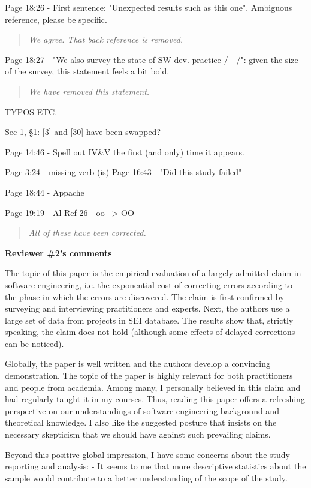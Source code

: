 \documentclass[smallcondensed]{svjour3}
\begin{document}
 
Page 18:26 - First sentence: "Unexpected results such as this one". Ambiguous reference,
please be specific.  
\begin{quote}{\em  We agree. That back reference is removed. }\end{quote}  



Page 18:27 - "We also survey the state of SW dev. practice /---/": given the size of the survey,
this statement feels a bit bold.

\begin{quote}{\em We have removed this statement.}\end{quote}  
 
TYPOS ETC.  

Sec 1, §1: [3] and [30] have been swapped?  

Page 14:46 - Spell out IV\&V the first (and only) time it appears.

Page 3:24 - missing verb (is) Page 16:43 - "Did this study failed" 

Page 18:44 - Appache 

Page 19:19 - Al Ref 26 - oo --> OO

\begin{quote}{\em  All of these have been corrected. }\end{quote}  

{\bf Reviewer \#2's comments}

The topic of this paper is the empirical
evaluation of a largely admitted claim in software
engineering, i.e. the exponential cost of correcting errors
according to the phase in which the errors are discovered.
The claim is first confirmed by surveying and interviewing
practitioners and experts. Next, the authors use a large set
of data from projects in SEI database. The results show
that, strictly speaking, the claim does not hold (although
some effects of delayed corrections can be noticed).

Globally, the paper is well written and the authors develop
a convincing demonstration. The topic of the paper is highly
relevant for both practitioners and people from academia.
Among many, I personally believed in this claim and had
regularly taught it in my courses. Thus, reading this paper
offers a refreshing perspective on our understandings of
software engineering background and theoretical knowledge. I
also like the suggested posture that insists on the
necessary skepticism that we should have against such
prevailing claims.

Beyond this positive global impression, I have some concerns
about the study reporting and analysis: -  It seems to me
that more descriptive statistics about the sample would
contribute to a better understanding of the scope of the
study. 
\end{document}
